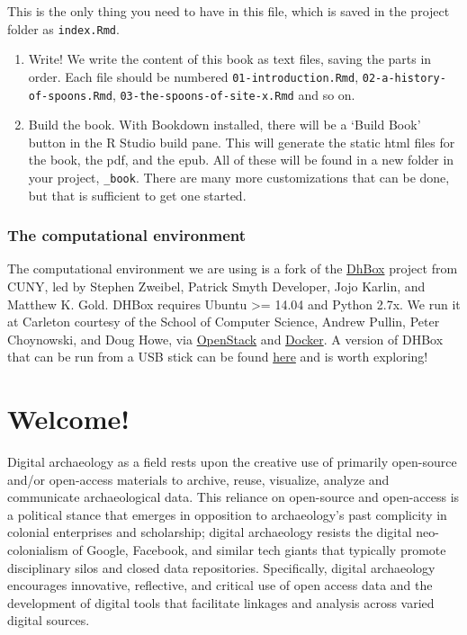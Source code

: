 \documentclass[english,]{book}
\begin{document}
This is the only thing you need to have in this file, which is saved in
the project folder as \texttt{index.Rmd}.

\begin{enumerate}
\def\labelenumi{\arabic{enumi}.}
\setcounter{enumi}{3}
\item
  Write! We write the content of this book as text files, saving the
  parts in order. Each file should be numbered
  \texttt{01-introduction.Rmd}, \texttt{02-a-history-of-spoons.Rmd},
  \texttt{03-the-spoons-of-site-x.Rmd} and so on.
\item
  Build the book. With Bookdown installed, there will be a `Build Book'
  button in the R Studio build pane. This will generate the static html
  files for the book, the pdf, and the epub. All of these will be found
  in a new folder in your project, \texttt{\_book}. There are many more
  customizations that can be done, but that is sufficient to get one
  started.
\end{enumerate}

\subsection*{The computational
environment}\label{the-computational-environment}

The computational environment we are using is a fork of the
\href{http://dhbox.org}{DhBox} project from CUNY, led by Stephen
Zweibel, Patrick Smyth Developer, Jojo Karlin, and Matthew K. Gold.
DHBox requires Ubuntu \textgreater{}= 14.04 and Python 2.7x. We run it
at Carleton courtesy of the School of Computer Science, Andrew Pullin,
Peter Choynowski, and Doug Howe, via
\href{https://www.openstack.org/}{OpenStack} and
\href{https://www.docker.com/}{Docker}. A version of DHBox that can be
run from a USB stick can be found
\href{https://github.com/DH-Box/dh-usb}{here} and is worth exploring!

\chapter*{Welcome!}\label{welcome}

Digital archaeology as a field rests upon the creative use of primarily
open-source and/or open-access materials to archive, reuse, visualize,
analyze and communicate archaeological data. This reliance on
open-source and open-access is a political stance that emerges in
opposition to archaeology's past complicity in colonial enterprises and
scholarship; digital archaeology resists the digital neo-colonialism of
Google, Facebook, and similar tech giants that typically promote
disciplinary silos and closed data repositories. Specifically, digital
archaeology encourages innovative, reflective, and critical use of open
access data and the development of digital tools that facilitate
linkages and analysis across varied digital sources.
\end{document}
